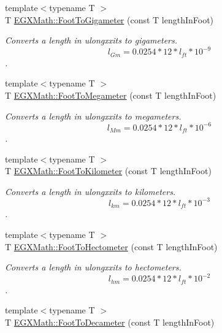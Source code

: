 \begin{DoxyCompactItemize}
{\footnotesize template$<$typename T $>$ }\\T \mbox{\hyperlink{group___e_g_x_math-_conversions-_length_conversions-_imperial-_foot-_s_i_ga396dd6b0ee16dd5c9a11688377a85c52}{E\+G\+X\+Math\+::\+Foot\+To\+Gigameter}} (const T length\+In\+Foot)
\begin{DoxyCompactList}\small\item\em Converts a length in ulongxxits to gigameters. \[ l_{Gm}=0.0254 * 12 * l_{ft} * 10^{-9} \]. \end{DoxyCompactList}\item 
{\footnotesize template$<$typename T $>$ }\\T \mbox{\hyperlink{group___e_g_x_math-_conversions-_length_conversions-_imperial-_foot-_s_i_ga6c4a1e4268e872deaa6e8167c69b0038}{E\+G\+X\+Math\+::\+Foot\+To\+Megameter}} (const T length\+In\+Foot)
\begin{DoxyCompactList}\small\item\em Converts a length in ulongxxits to megameters. \[ l_{Mm}=0.0254 * 12 * l_{ft} * 10^{-6} \]. \end{DoxyCompactList}\item 
{\footnotesize template$<$typename T $>$ }\\T \mbox{\hyperlink{group___e_g_x_math-_conversions-_length_conversions-_imperial-_foot-_s_i_ga7ba5eab58921ef00677d0b7db78d4daf}{E\+G\+X\+Math\+::\+Foot\+To\+Kilometer}} (const T length\+In\+Foot)
\begin{DoxyCompactList}\small\item\em Converts a length in ulongxxits to kilometers. \[ l_{km}=0.0254 * 12 * l_{ft} * 10^{-3} \]. \end{DoxyCompactList}\item 
{\footnotesize template$<$typename T $>$ }\\T \mbox{\hyperlink{group___e_g_x_math-_conversions-_length_conversions-_imperial-_foot-_s_i_ga355716f167803ca8218c845eb7df7792}{E\+G\+X\+Math\+::\+Foot\+To\+Hectometer}} (const T length\+In\+Foot)
\begin{DoxyCompactList}\small\item\em Converts a length in ulongxxits to hectometers. \[ l_{hm}=0.0254 * 12 * l_{ft} * 10^{-2} \]. \end{DoxyCompactList}\item 
{\footnotesize template$<$typename T $>$ }\\T \mbox{\hyperlink{group___e_g_x_math-_conversions-_length_conversions-_imperial-_foot-_s_i_gad602d1172e39cba2884e22630a2859a0}{E\+G\+X\+Math\+::\+Foot\+To\+Decameter}} (const T length\+In\+Foot)

\end{DoxyCompactItemize}
